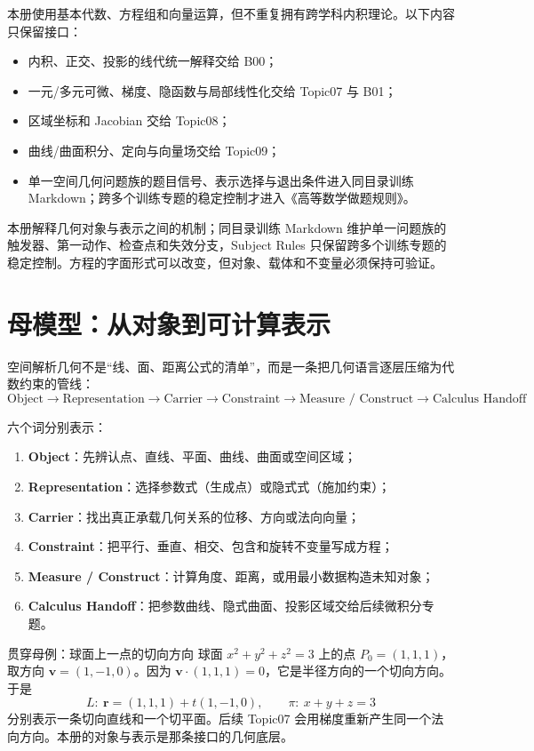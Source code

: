\documentclass[11pt,a4paper]{ctexart}
\newcommand{\kw}[1]{\textbf{\color{deep}#1}}
\begin{document}
本册使用基本代数、方程组和向量运算，但不重复拥有跨学科内积理论。以下内容只保留接口：
\begin{itemize}
  \item 内积、正交、投影的线代统一解释交给 B00；
  \item 一元/多元可微、梯度、隐函数与局部线性化交给 Topic07 与 B01；
  \item 区域坐标和 Jacobian 交给 Topic08；
  \item 曲线/曲面积分、定向与向量场交给 Topic09；
  \item 单一空间几何问题族的题目信号、表示选择与退出条件进入同目录训练 Markdown；跨多个训练专题的稳定控制才进入《高等数学做题规则》。
\end{itemize}

本册解释几何对象与表示之间的机制；同目录训练 Markdown 维护单一问题族的触发器、第一动作、检查点和失效分支，Subject Rules 只保留跨多个训练专题的稳定控制。方程的字面形式可以改变，但对象、载体和不变量必须保持可验证。

\section{母模型：从对象到可计算表示}

空间解析几何不是“线、面、距离公式的清单”，而是一条把几何语言逐层压缩为代数约束的管线：
\[
\boxed{
\text{Object}
\to\text{Representation}
\to\text{Carrier}
\to\text{Constraint}
\to\text{Measure / Construct}
\to\text{Calculus Handoff}}
\]

六个词分别表示：
\begin{enumerate}
  \item \kw{Object}：先辨认点、直线、平面、曲线、曲面或空间区域；
  \item \kw{Representation}：选择参数式（生成点）或隐式式（施加约束）；
  \item \kw{Carrier}：找出真正承载几何关系的位移、方向或法向向量；
  \item \kw{Constraint}：把平行、垂直、相交、包含和旋转不变量写成方程；
  \item \kw{Measure / Construct}：计算角度、距离，或用最小数据构造未知对象；
  \item \kw{Calculus Handoff}：把参数曲线、隐式曲面、投影区域交给后续微积分专题。
\end{enumerate}

\begin{corebox}{贯穿母例：球面上一点的切向方向}
球面 $x^2+y^2+z^2=3$ 上的点 $P_0=(1,1,1)$，取方向 $\mathbf v=(1,-1,0)$。因为 $\mathbf v\cdot(1,1,1)=0$，它是半径方向的一个切向方向。于是
\[
L:\ \mathbf r=(1,1,1)+t(1,-1,0),
\qquad
\pi:\ x+y+z=3
\]
分别表示一条切向直线和一个切平面。后续 Topic07 会用梯度重新产生同一个法向方向。本册的对象与表示是那条接口的几何底层。
\end{corebox}
\end{document}
